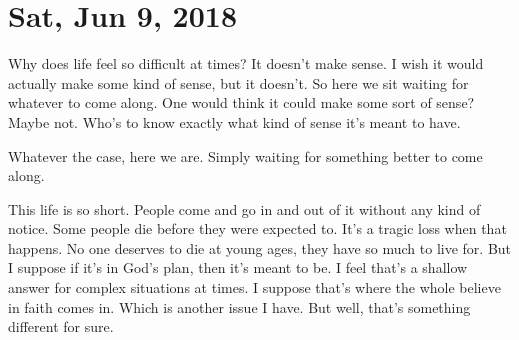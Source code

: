 \section{Sat, Jun 9, 2018}

Why does life feel so difficult at times? It doesn't make sense. I wish it would
actually make some kind of sense, but it doesn't. So here we sit waiting for
whatever to come along. One would think it could make some sort of sense? Maybe
not. Who's to know exactly what kind of sense it's meant to have.

Whatever the case, here we are. Simply waiting for something better to come
along.

This life is so short. People come and go in and out of it without any kind of
notice. Some people die before they were expected to. It's a tragic loss when
that happens. No one deserves to die at young ages, they have so much to live
for. But I suppose if it's in God's plan, then it's meant to be. I feel that's a
shallow answer for complex situations at times. I suppose that's where the whole
believe in faith comes in. Which is another issue I have. But well, that's
something different for sure.